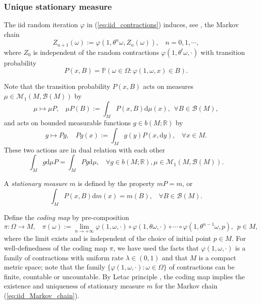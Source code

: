 \documentclass[a4paper]{article}
\theoremstyle{plain}
\theoremstyle{definition}
\newcommand{\PP}{\mathbb{P}}
\newcommand{\R}{\mathbb{R}}
\newcommand{\Bil}{\mathcal{B}}
\newcommand{\Mil}{\mathcal{M}}
\newcommand{\One}{\mathbbm{1}}
\begin{document}
\subsubsection{Unique stationary measure}
The iid random iteration $\varphi$ in (\ref{eq:iid_contractions}) induces, see \cite[Theorem 2.1.4]{Arnold1998}, the Markov chain
\begin{equation}\label{eq:iid_Markov_chain}
	Z_{n+1}(\omega):= \varphi(1,\theta^{n}\omega,Z_{n}(\omega)),~~~~n=0,1,\cdots,
\end{equation}
where $Z_0$ is independent of the random contractions $\varphi(1,\theta^t\omega,\cdot)$ with transition probability
$$P(x,B)=\PP(\omega\in\Omega: \varphi(1,\omega,x)\in B).$$

Note that the transition probability $P(x,B)$ acts on measures $\mu\in\Mil_1(M,\Bil(M))$ by
$$\mu\mapsto \mu P,~~~~\mu P(B):=\int_M P(x,B)\mathrm{d}\mu(x),~~\forall B\in\Bil(M),$$
and acts on bounded measurable functions $g\in b(M;\R)$ by
$$g\mapsto Pg,~~~~Pg(x):=\int_M g(y) P(x,\mathrm{d}y),~~~~\forall x\in M.$$
These two actions are in dual relation with each other
$$\int_M g \mathrm{d}\mu P = \int_M Pg \mathrm{d}\mu,~~~~\forall g\in b(M;\R),\mu\in\Mil_1(M,\Bil(M)).$$


A \textit{stationary measure} $m$ is defined by the property $mP=m$, or
$$\int_M P(x,B)\mathrm{d}m(x)=m(B),~~~~\forall B\in \Bil(M).$$%

Define the \textit{coding map} by pre-composition
\begin{equation}\label{eq:iid_contractions_coding_map}
	\pi:\Omega\to M,~~~~\pi(\omega):=\lim_{n\to+\infty} \varphi(1,\omega,\cdot)\circ\varphi(1,\theta\omega,\cdot)\circ\cdots\circ \varphi(1,\theta^{n-1}\omega,p),~~p\in M,
\end{equation}
where the limit exists and is independent of the choice of initial point $p\in M$. For well-definedness of the coding map $\pi$, we have used the facts that $\varphi(1,\omega,\cdot)$ is a family of contractions with uniform rate $\lambda\in(0,1)$ and that $M$ is a compact metric space; note that the family $\{\varphi(1,\omega,\cdot):\omega\in\Omega\}$ of contractions can be finite, countable or uncountable. By Letac principle \cite{Letac1986}, the coding map implies the existence and uniqueness of stationary measure $m$ for the Markov chain (\ref{eq:iid_Markov_chain}).
\end{document}

